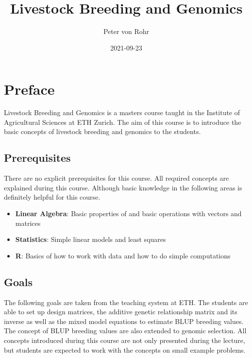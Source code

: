 \documentclass[
]{book}
\title{Livestock Breeding and Genomics}
\author{Peter von Rohr}
\date{2021-09-23}
\providecommand{\tightlist}{%
  \setlength{\itemsep}{0pt}\setlength{\parskip}{0pt}}
\begin{document}
\maketitle

{
\setcounter{tocdepth}{1}
\tableofcontents
}
\hypertarget{preface}{%
\chapter*{Preface}\label{preface}}

Livestock Breeding and Genomics is a masters course taught in the Institute of Agricultural Sciences at ETH Zurich. The aim of this course is to introduce the basic concepts of livestock breeding and genomics to the students.

\hypertarget{prerequisites}{%
\section*{Prerequisites}\label{prerequisites}}

There are no explicit prerequisites for this course. All required concepts are explained during this course. Although basic knowledge in the following areas is definitely helpful for this course.

\begin{itemize}
\tightlist
\item
  \textbf{Linear Algebra}: Basic properties of and basic operations with vectors and matrices
\item
  \textbf{Statistics}: Simple linear models and least squares
\item
  \textbf{R}: Basics of how to work with data and how to do simple computations
\end{itemize}

\hypertarget{goals}{%
\section*{Goals}\label{goals}}

The following goals are taken from the teaching system at ETH. The students are able to set up design matrices, the additive genetic relationship matrix and its inverse as well as the mixed model equations to estimate BLUP breeding values. The concept of BLUP breeding values are also extended to genomic selection. All concepts introduced during this course are not only presented during the lecture, but students are expected to work with the concepts on small example problems.
\end{document}
